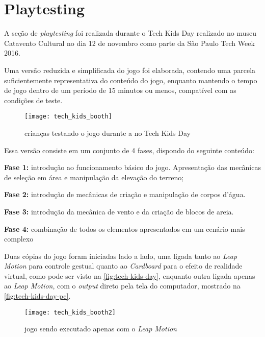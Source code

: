 \section{Playtesting}\label{sec-playtesting}

A seção de \textit{playtesting} foi realizada durante o Tech Kids Day 
realizado no museu Catavento Cultural no dia 12 de novembro como parte 
da São Paulo Tech Week 2016. 

Uma versão reduzida e simplificada do jogo foi elaborada, contendo uma 
parcela suficientemente representativa do conteúdo do jogo, enquanto 
mantendo o tempo de jogo dentro de um período de 15 minutos ou menos, 
compatível com as condições de teste.

\begin{figure}[h]
	\centering
	\caption{crianças testando o jogo durante a no Tech Kids Day}
	\texttt{[image: tech\_kids\_booth]}
	\legend{\fonteAP}
	\label{fig:tech-kids-day}
\end{figure}

Essa versão consiste em um conjunto de 4 fases, dispondo do seguinte conteúdo:

\begin{alineas}
	\item \textbf{Fase 1:} introdução ao funcionamento básico do jogo. Apresentação das mecânicas de seleção em área e manipulação da elevação do terreno;
	\item \textbf{Fase 2:} introdução de mecânicas de criação e manipulação de corpos d'água.
	\item \textbf{Fase 3:} introdução da mecânica de vento e da criação de blocos de areia.
	\item \textbf{Fase 4:} combinação de todos os elementos apresentados em um cenário mais complexo
\end{alineas}

Duas cópias do jogo foram iniciadas lado a lado, uma ligada tanto 
ao \textit{Leap Motion} para controle gestual quanto ao \textit{Cardboard} 
para o efeito de realidade virtual, como pode ser visto 
na \autoref{fig:tech-kids-day}, enquanto outra ligada apenas ao 
\textit{Leap Motion}, com o \textit{output} direto pela tela do computador, 
mostrado na \autoref{fig:tech-kids-day-pc}.

\begin{figure}[h]
	\centering
	\caption{jogo sendo executado apenas com o \textit{Leap Motion}}
	\texttt{[image: tech\_kids\_booth2]}
	\legend{\fonteAP}
	\label{fig:tech-kids-day-pc}
\end{figure}


